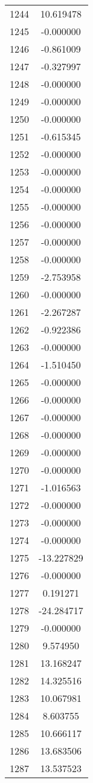 \documentclass[12pt]{article}
\begin{document}
\begin{longtable}{@{}cc@{}}
1244 & 10.619478 \\
1245 & -0.000000 \\
1246 & -0.861009 \\
1247 & -0.327997 \\
1248 & -0.000000 \\
1249 & -0.000000 \\
1250 & -0.000000 \\
1251 & -0.615345 \\
1252 & -0.000000 \\
1253 & -0.000000 \\
1254 & -0.000000 \\
1255 & -0.000000 \\
1256 & -0.000000 \\
1257 & -0.000000 \\
1258 & -0.000000 \\
1259 & -2.753958 \\
1260 & -0.000000 \\
1261 & -2.267287 \\
1262 & -0.922386 \\
1263 & -0.000000 \\
1264 & -1.510450 \\
1265 & -0.000000 \\
1266 & -0.000000 \\
1267 & -0.000000 \\
1268 & -0.000000 \\
1269 & -0.000000 \\
1270 & -0.000000 \\
1271 & -1.016563 \\
1272 & -0.000000 \\
1273 & -0.000000 \\
1274 & -0.000000 \\
1275 & -13.227829 \\
1276 & -0.000000 \\
1277 & 0.191271 \\
1278 & -24.284717 \\
1279 & -0.000000 \\
1280 & 9.574950 \\
1281 & 13.168247 \\
1282 & 14.325516 \\
1283 & 10.067981 \\
1284 & 8.603755 \\
1285 & 10.666117 \\
1286 & 13.683506 \\
1287 & 13.537523 \\

\end{longtable}
\end{document}
